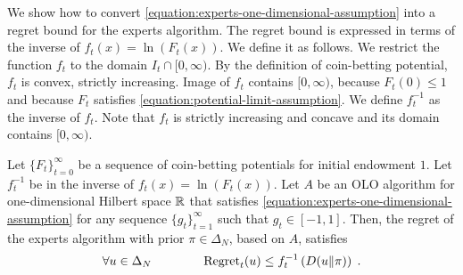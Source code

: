 We show how to convert \eqref{equation:experts-one-dimensional-assumption} into
a regret bound for the experts algorithm. The regret bound is expressed in terms
of the inverse of $f_t(x) = \ln(F_t(x))$. We define it as follows. We
restrict the function $f_t$ to the domain $I_t \cap [0, \infty)$. By the
definition of coin-betting potential, $f_t$ is convex, strictly increasing.
Image of $f_t$ contains $[0,\infty)$, because $F_t(0) \le 1$ and because $F_t$
satisfies \eqref{equation:potential-limit-assumption}. We define $f_t^{-1}$ as
the inverse of $f_t$. Note that $f_t$ is strictly increasing and concave and its
domain contains $[0, \infty)$.

\begin{theorem}
\label{theorem:regret-bound-experts}
Let $\{F_t\}_{t=0}^\infty$ be a sequence of coin-betting potentials for initial
endowment $1$. Let $f_t^{-1}$ be in the inverse of $f_t(x) = \ln(F_t(x))$.
Let $A$ be an OLO algorithm for one-dimensional Hilbert space
$\mathbb{R}$ that satisfies \eqref{equation:experts-one-dimensional-assumption} for any
sequence $\{g_t\}_{t=1}^\infty$ such that $g_t \in [-1,1]$. Then, the regret of
the experts algorithm with prior $\pi \in \Delta_N$, based on $A$, satisfies
$$
\forall u \in \Delta_N \qquad \qquad
\operatorname{Regret}_t(u) \le f_t^{-1}\left( D({u}\|{\pi}) \right) \; .
$$
\end{theorem}

